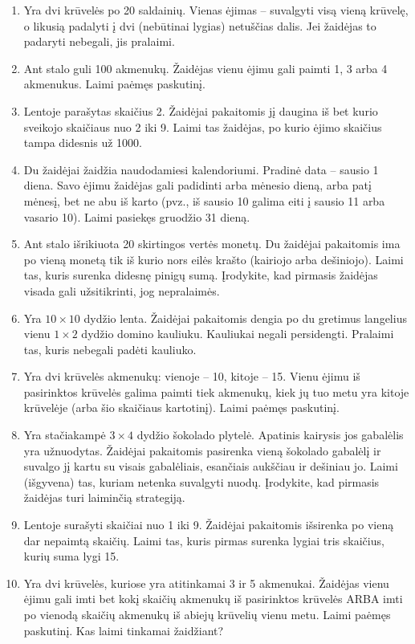 \documentclass[11pt,a4paper]{scrartcl}
\begin{document}
\begin{enumerate}
    \item Yra dvi krūvelės po 20 saldainių. Vienas ėjimas – suvalgyti visą vieną krūvelę, o likusią padalyti į dvi (nebūtinai lygias) netuščias dalis. Jei žaidėjas to padaryti nebegali, jis pralaimi.
    \item Ant stalo guli 100 akmenukų. Žaidėjas vienu ėjimu gali paimti 1, 3 arba 4 akmenukus. Laimi paėmęs paskutinį.
    \item Lentoje parašytas skaičius 2. Žaidėjai pakaitomis jį daugina iš bet kurio sveikojo skaičiaus nuo 2 iki 9. Laimi tas žaidėjas, po kurio ėjimo skaičius tampa didesnis už 1000.
    \item Du žaidėjai žaidžia naudodamiesi kalendoriumi. Pradinė data – sausio 1 diena. Savo ėjimu žaidėjas gali padidinti arba mėnesio dieną, arba patį mėnesį, bet ne abu iš karto (pvz., iš sausio 10 galima eiti į sausio 11 arba vasario 10). Laimi pasiekęs gruodžio 31 dieną.
    \item Ant stalo išrikiuota 20 skirtingos vertės monetų. Du žaidėjai pakaitomis ima po vieną monetą tik iš kurio nors eilės krašto (kairiojo arba dešiniojo). Laimi tas, kuris surenka didesnę pinigų sumą. Įrodykite, kad pirmasis žaidėjas visada gali užsitikrinti, jog nepralaimės.
    \item Yra $10 \times 10$ dydžio lenta. Žaidėjai pakaitomis dengia po du gretimus langelius vienu $1 \times 2$ dydžio domino kauliuku. Kauliukai negali persidengti. Pralaimi tas, kuris nebegali padėti kauliuko.
    \item Yra dvi krūvelės akmenukų: vienoje – 10, kitoje – 15. Vienu ėjimu iš pasirinktos krūvelės galima paimti tiek akmenukų, kiek jų tuo metu yra kitoje krūvelėje (arba šio skaičiaus kartotinį). Laimi paėmęs paskutinį.
    \item Yra stačiakampė $3 \times 4$ dydžio šokolado plytelė. Apatinis kairysis jos gabalėlis yra užnuodytas. Žaidėjai pakaitomis pasirenka vieną šokolado gabalėlį ir suvalgo jį kartu su visais gabalėliais, esančiais aukščiau ir dešiniau jo. Laimi (išgyvena) tas, kuriam netenka suvalgyti nuodų. Įrodykite, kad pirmasis žaidėjas turi laiminčią strategiją.
    \item Lentoje surašyti skaičiai nuo 1 iki 9. Žaidėjai pakaitomis išsirenka po vieną dar nepaimtą skaičių. Laimi tas, kuris pirmas surenka lygiai tris skaičius, kurių suma lygi 15.
    \item Yra dvi krūvelės, kuriose yra atitinkamai 3 ir 5 akmenukai. Žaidėjas vienu ėjimu gali imti bet kokį skaičių akmenukų iš pasirinktos krūvelės ARBA imti po vienodą skaičių akmenukų iš abiejų krūvelių vienu metu. Laimi paėmęs paskutinį. Kas laimi tinkamai žaidžiant?

\end{enumerate}
\end{document}

